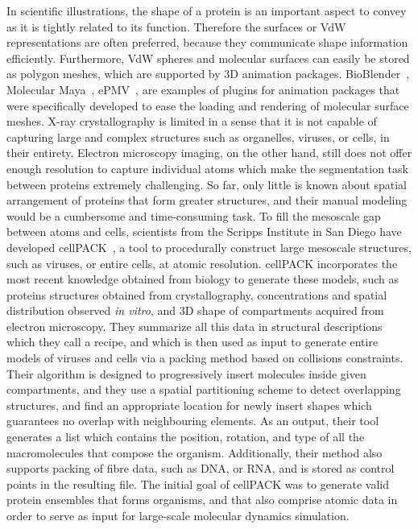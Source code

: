 In scientific illustrations, the shape of a protein is an important aspect to convey as it is tightly related to its function.
Therefore the surfaces or VdW representations are often preferred, because they communicate shape information efficiently.
Furthermore, VdW spheres and molecular surfaces can easily be stored as polygon meshes, which are supported by 3D animation packages.
BioBlender~\cite{andrei2012intuitive}, Molecular Maya~\cite{mmaya}, ePMV~\cite{johnson2011epmv}, are examples of plugins for animation packages that were specifically developed to ease the loading and rendering of molecular surface meshes.
X-ray crystallography is limited in a sense that it is not capable of capturing large and complex structures such as organelles, viruses, or cells, in their entirety.
Electron microscopy imaging, on the other hand, still does not offer enough resolution to capture individual atoms which make the segmentation task between proteins extremely challenging.
So far, only little is known about spatial arrangement of proteins that form greater structures, and their manual modeling would be a cumbersome and time-consuming task.
To fill the mesoscale gap between atoms and cells, scientists from the Scripps Institute in San Diego have developed cellPACK~\cite{johnson2015cellpack}, a tool to procedurally construct large mesoscale structures, such as viruses, or entire cells, at atomic resolution.
cellPACK incorporates the most recent knowledge obtained from biology to generate these models, such as proteins structures obtained from crystallography, concentrations and spatial distribution observed \textit{in vitro}, and 3D shape of compartments acquired from electron microscopy.
They summarize all this data in structural descriptions which they call a recipe, and which is then used as input to generate entire models of viruses and cells via a packing method based on collisions constraints.
Their algorithm is designed to progressively insert molecules inside given compartments, and they use a spatial partitioning scheme to detect overlapping structures, and find an appropriate location for newly insert shapes which guarantees no overlap with neighbouring elements.
As an output, their tool generates a list which contains the position, rotation, and type of all the macromolecules that compose the organism.
Additionally, their method also supports packing of fibre data, such as DNA, or RNA, and is stored as control points in the resulting file.
The initial goal of cellPACK was to generate valid protein ensembles that forms organisms, and that also comprise atomic data in order to serve as input for large-scale molecular dynamics simulation.
